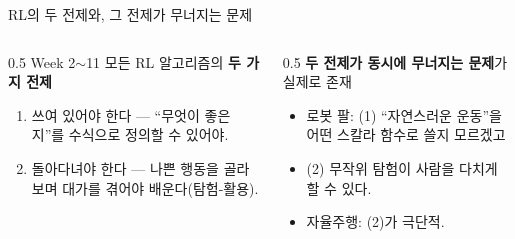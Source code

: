 \begin{frame}{RL의 두 전제와, 그 전제가 무너지는 문제}
  \begin{columns}[T]
    \begin{column}{0.5\textwidth}
      Week 2$\sim$11 모든 RL 알고리즘의 \textbf{두 가지 전제}
      \begin{enumerate}
        \item {} 쓰여 있어야 한다 — ``무엇이
          좋은지''를 수식으로 정의할 수 있어야.
        \item {} 돌아다녀야 한다 —
          나쁜 행동을 골라보며 대가를 겪어야 배운다(탐험-활용).
      \end{enumerate}
    \end{column}
    \begin{column}{0.5\textwidth}
      \textbf{두 전제가 동시에 무너지는 문제}가 실제로 존재
      \begin{itemize}
        \item 로봇 팔: (1) ``자연스러운 운동''을 어떤 스칼라 함수로
          쓸지 모르겠고
        \item (2) 무작위 탐험이 사람을 다치게 할 수 있다.
        \item 자율주행: (2)가 극단적.
      \end{itemize}
    \end{column}
  \end{columns}
\end{frame}
